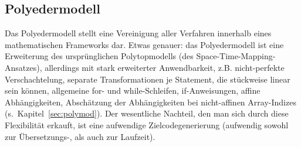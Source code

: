 \subsection{Polyedermodell}

Das Polyedermodell stellt eine Vereinigung aller Verfahren innerhalb
eines mathematischen Frameworks dar. Etwas genauer: das Polyedermodell
ist eine Erweiterung des ursprünglichen Polytopmodells (des
Space-Time-Mapping-Ansatzes), allerdings mit stark erweiterter
Anwendbarkeit, z.B.  nicht-perfekte Verschachtelung, separate
Transformationen je Statement, die stückweise linear sein können,
allgemeine {\sf for}- und {\sf while}-Schleifen, {\sf if}-Anweisungen,
affine Abhängigkeiten, Ab\-schät\-zung der Abhängigkeiten bei nicht-affinen
Array-Indizes (s.~Kapitel~\ref{sec:polymod}). Der wesentliche Nachteil,
den man sich durch diese Flexibilität erkauft, ist eine aufwendige
Zielcodegenerierung (aufwendig sowohl zur Übersetzungs-, als auch zur
Laufzeit).
